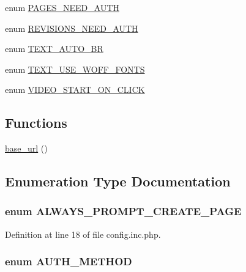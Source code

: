 \begin{DoxyCompactItemize}
\item 
enum \hyperlink{config_8inc_8php_a11f5534165e1764860b16cc7215b2141}{PAGES\_\-NEED\_\-AUTH} 
\item 
enum \hyperlink{config_8inc_8php_a67b9479d334a4e6c33c0bc3505b3eb5e}{REVISIONS\_\-NEED\_\-AUTH} 
\item 
enum \hyperlink{config_8inc_8php_a6f581226f389510394c592491ebedc0b}{TEXT\_\-AUTO\_\-BR} 
\item 
enum \hyperlink{config_8inc_8php_aca83853e44d4952801b133bf687a1056}{TEXT\_\-USE\_\-WOFF\_\-FONTS} 
\item 
enum \hyperlink{config_8inc_8php_ae1e42e1baa41f003453356a3747f9fee}{VIDEO\_\-START\_\-ON\_\-CLICK} 
\end{DoxyCompactItemize}
\subsection*{Functions}
\begin{DoxyCompactItemize}
\item 
\hyperlink{config_8inc_8php_a8fdfb46e432b25bbdad23971a23a26b5}{base\_\-url} ()
\end{DoxyCompactItemize}


\subsection{Enumeration Type Documentation}
\hypertarget{config_8inc_8php_af7115c186e2e18cb1839aed9d163b31a}{
\subsubsection[{ALWAYS\_\-PROMPT\_\-CREATE\_\-PAGE}]{\setlength{\rightskip}{0pt plus 5cm}enum {\bf ALWAYS\_\-PROMPT\_\-CREATE\_\-PAGE}}}
\label{config_8inc_8php_af7115c186e2e18cb1839aed9d163b31a}


Definition at line 18 of file config.inc.php.

\hypertarget{config_8inc_8php_a2ee7e30fa45253c5e303994703d3293f}{
\subsubsection[{AUTH\_\-METHOD}]{\setlength{\rightskip}{0pt plus 5cm}enum {\bf AUTH\_\-METHOD}}}
\label{config_8inc_8php_a2ee7e30fa45253c5e303994703d3293f}


